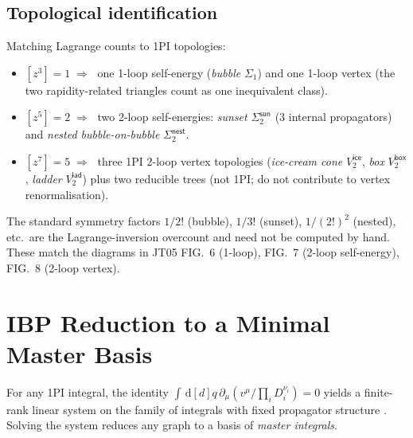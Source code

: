 \documentclass[11pt,a4paper]{article}
\renewcommand{\dd}[1]{\,\mathrm{d}#1}
\theoremstyle{definition}
\theoremstyle{plain}
\begin{document}
\subsection{Topological identification}

\begin{cfacbox}
Matching Lagrange counts to 1PI topologies:
\begin{itemize}[leftmargin=2em]
  \item $[z^3] = 1 \;\Rightarrow\;$ one 1-loop self-energy
    (\emph{bubble} $\Sigma_1$) and one 1-loop vertex (the two
    rapidity-related triangles count as one inequivalent class).
  \item $[z^5] = 2 \;\Rightarrow\;$ two 2-loop self-energies:
    \emph{sunset} $\Sigma_2^{\textsf{sun}}$ (3 internal propagators)
    and \emph{nested bubble-on-bubble} $\Sigma_2^{\textsf{nest}}$.
  \item $[z^7] = 5 \;\Rightarrow\;$ three 1PI 2-loop vertex
    topologies (\emph{ice-cream cone} $V_2^{\textsf{ice}}$, \emph{box}
    $V_2^{\textsf{box}}$, \emph{ladder} $V_2^{\textsf{lad}}$) plus
    two reducible trees (not 1PI; do not contribute to vertex
    renormalisation).
\end{itemize}
The standard symmetry factors $1/2!$ (bubble), $1/3!$ (sunset),
$1/(2!)^2$ (nested), etc.\ are the Lagrange-inversion overcount and
need not be computed by hand.  These match the diagrams in JT05
FIG.~6 (1-loop), FIG.~7 (2-loop self-energy), FIG.~8 (2-loop vertex).
\end{cfacbox}

\section{IBP Reduction to a Minimal Master Basis}
\label{sec:ibp}

\begin{acbox}
For any 1PI integral, the identity $\int\dd[d]{q}\,\partial_\mu(v^\mu /
\prod_i D_i^{\nu_i}) = 0$ yields a finite-rank linear system on the
family of integrals with fixed propagator structure
\cite{Smirnov2012}.  Solving the system reduces any graph to a basis
of \emph{master integrals}.
\end{acbox}
\end{document}
